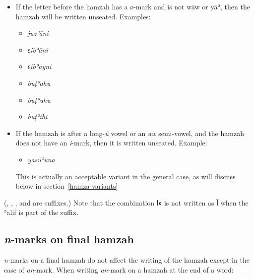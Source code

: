\documentclass[
  10pt,
]{book}
\providecommand{\tightlist}{%
  \setlength{\itemsep}{0pt}\setlength{\parskip}{0pt}}
\begin{document}
\begin{itemize}
\item
  If the letter before the hamzah has a ø-mark and is not wāw or yāʾ,
  then the hamzah will be written unseated. Examples:

  \begin{itemize}
  \tightlist
  \item
    \vphantom{\huge J} {} \emph{juzʾāni}\\
  \item
    \vphantom{\huge J} {} \emph{ɛibʾāni}\\
  \item
    \vphantom{\huge J} {} \emph{ɛibʾayni}\\
  \item
    \vphantom{\huge J} {} \emph{buṭʾahu}\\
  \item
    \vphantom{\huge J} {} \emph{buṭʾuhu}\\
  \item
    \vphantom{\huge J} {} \emph{buṭʾihi}
  \end{itemize}
\item
  If the hamzah is after a long-\emph{ū} vowel or an \emph{aw} semi-vowel, and the hamzah does not have an \emph{i}-mark, then it is written unseated. Example:

  \begin{itemize}
  \tightlist
  \item
    \vphantom{\huge J} {} \emph{yasūʾūna}
  \end{itemize}

  This is actually an acceptable variant in the general case, as will discuss below in section~\ref{hamza-variants}
\end{itemize}

({}, {}, {}, and {} are suffixes.)
Note that the combination \foreignlanguage{arabic}{ءا} is not written as \foreignlanguage{arabic}{آ} when the ʾalif is part of the suffix.

\subsection{\texorpdfstring{\emph{n}-marks on final hamzah}{n-marks on final hamzah}}\label{n-marks-on-final-hamzah}

\emph{n}-marks on a final hamzah do not affect the writing of the hamzah except in the case of \emph{an}-mark. When writing \emph{an}-mark on a hamzah at the end of a word:
\end{document}
